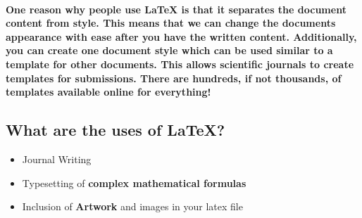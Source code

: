 \documentclass[12pt]{article}
\begin{document}
	\paragraph{One reason why people use LaTeX is that it separates the document content from style. This means that we can change the documents appearance with ease after you have the written content. Additionally, you can create one document style which can be used similar to a template for other documents. This allows scientific journals to create templates for submissions. There are hundreds, if not thousands, of templates available online for everything!}

\subsection{What are the uses of LaTeX?}
	\begin{itemize}
	\item{Journal Writing} 
	\item{Typesetting of \textbf{complex mathematical formulas}}
	\item{Inclusion of \textbf{Artwork} and images in your latex file}	
	\end{itemize}
\end{document}
